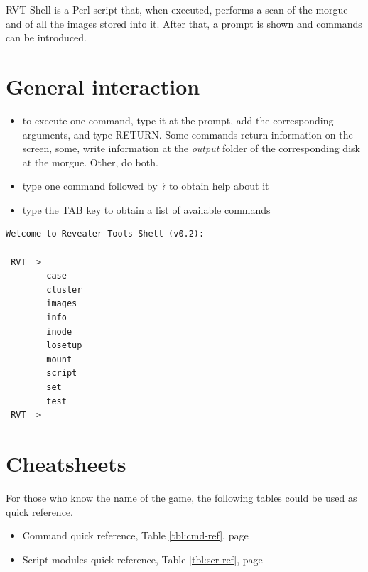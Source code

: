 \documentclass[a4paper,11pt,oneside]{report}
\begin{document}
RVT Shell is a Perl script that, when executed, performs a scan of the morgue and of all the images stored into it. After that, a prompt is shown and commands can be introduced.



\section{General interaction}

\begin{itemize}
\item to execute one command, type it at the prompt, add the corresponding arguments, and type RETURN. Some commands return information on the screen, some, write information at the \emph{output} folder of the corresponding disk at the morgue. Other, do both.

\item type one command followed by \emph{?} to obtain help about it

\item type the TAB key to obtain a list of available commands

\end{itemize}

\begin{verbatim}
Welcome to Revealer Tools Shell (v0.2):

 RVT  > 
        case
        cluster
        images
        info
        inode
        losetup
        mount
        script
        set
        test
 RVT  > 
\end{verbatim}





\section{Cheatsheets}

For those who know the name of the game, the following tables could be used as quick reference.

\begin{itemize}
\item Command quick reference, Table \ref{tbl:cmd-ref}, page \pageref{tbl:cmd-ref}
\item Script modules quick reference, Table \ref{tbl:scr-ref}, page \pageref{tbl:scr-ref}
\end{itemize}
\end{document}
